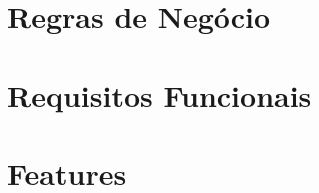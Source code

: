 \documentclass[dvips,ruledheader]{abnt}
\author{Álvaro Vilobaldo \emph{Rios}\\
Marcio \emph{Fernandes} Justino}
\begin{document}

%



\tableofcontents

\part{Regras de Negócio}











\part{Requisitos Funcionais}




\part{Features}


% 
% 
\end{document}
